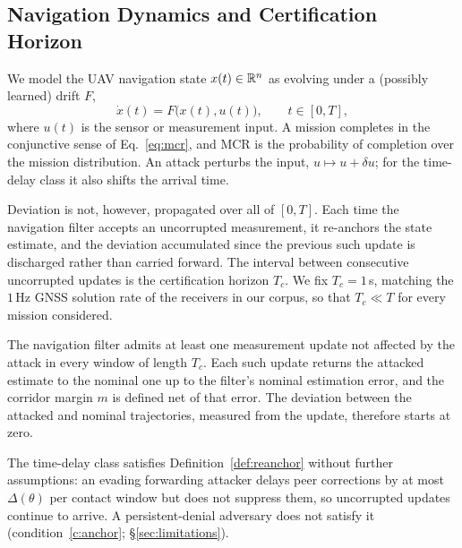 \subsection{Navigation Dynamics and Certification Horizon}
We model the UAV navigation state $x(t)\in\mathbb{R}^n$ as evolving under a (possibly
learned) drift $F$,
\begin{equation}
\label{eq:ode}
\dot{x}(t) = F\big(x(t), u(t)\big), \qquad t\in[0,T],
\end{equation}
where $u(t)$ is the sensor or measurement input. A mission completes in the
conjunctive sense of Eq.~\eqref{eq:mcr}, and MCR is the probability of
completion over the mission distribution. An attack perturbs the input,
$u\mapsto u+\delta u$; for the time-delay class it also shifts the arrival time.

Deviation is not, however, propagated over all of $[0,T]$. Each time the
navigation filter accepts an uncorrupted measurement, it re-anchors the state
estimate, and the deviation accumulated since the previous such update is
discharged rather than carried forward. The interval between consecutive
uncorrupted updates is the certification horizon $T_c$. We fix $T_c=1$\,s,
matching the $1$\,Hz GNSS solution rate of the receivers in our corpus, so that
$T_c\ll T$ for every mission considered.

\begin{definition}
\label{def:reanchor}
The navigation filter admits at least one measurement update not affected by the
attack in every window of length $T_c$. Each such update returns the attacked
estimate to the nominal one up to the filter's nominal estimation error, and the
corridor margin $m$ is defined net of that error. The deviation between the
attacked and nominal trajectories, measured from the update, therefore starts
at zero.
\end{definition}

The time-delay class satisfies Definition~\ref{def:reanchor} without further
assumptions: an evading forwarding attacker delays peer corrections by at most
$\Delta(\theta)$ per contact window but does not suppress them, so uncorrupted
updates continue to arrive. A persistent-denial adversary does not satisfy it
(condition~\ref{c:anchor}; \S\ref{sec:limitations}).

